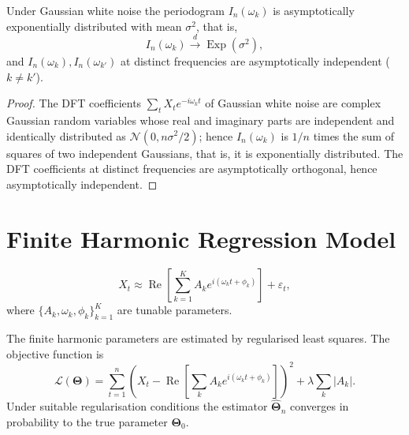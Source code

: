 \begin{property}\label{prop:ts_periodogram_distribution}
Under Gaussian white noise the periodogram $I_n(\omega_k)$ is asymptotically exponentially distributed with mean $\sigma^2$, that is,
\[
I_n(\omega_k)\xrightarrow{d}\operatorname{Exp}(\sigma^2),
\]
and $I_n(\omega_k),I_n(\omega_{k'})$ at distinct frequencies are asymptotically independent ($k\neq k'$).
\end{property}

\begin{proof}
The DFT coefficients $\sum_tX_te^{-i\omega_kt}$ of Gaussian white noise are complex Gaussian random variables whose real and imaginary parts are independent and identically distributed as $\mathcal{N}(0,n\sigma^2/2)$; hence $I_n(\omega_k)$ is $1/n$ times the sum of squares of two independent Gaussians, that is, it is exponentially distributed. The DFT coefficients at distinct frequencies are asymptotically orthogonal, hence asymptotically independent.
\end{proof}

\section{Finite Harmonic Regression Model}

\begin{definition}\label{def:ts_harmonic_regression}
\[
X_t \approx \operatorname{Re}\left[ \sum_{k=1}^{K} A_k e^{i(\omega_k t + \phi_k)} \right] + \varepsilon_t,
\]
where $\{A_k, \omega_k, \phi_k\}_{k=1}^{K}$ are tunable parameters.
\end{definition}

\begin{proposition}\label{prop:ts_harmonic_estimate}
The finite harmonic parameters are estimated by regularised least squares. The objective function is
\[
\mathcal{L}(\boldsymbol{\Theta}) = \sum_{t=1}^n \left( X_t - \operatorname{Re}\left[\sum_k A_k e^{i(\omega_k t + \phi_k)}\right] \right)^2 + \lambda \sum_k |A_k|.
\]
Under suitable regularisation conditions the estimator $\hat{\boldsymbol{\Theta}}_n$ converges in probability to the true parameter $\boldsymbol{\Theta}_0$.
\end{proposition}

